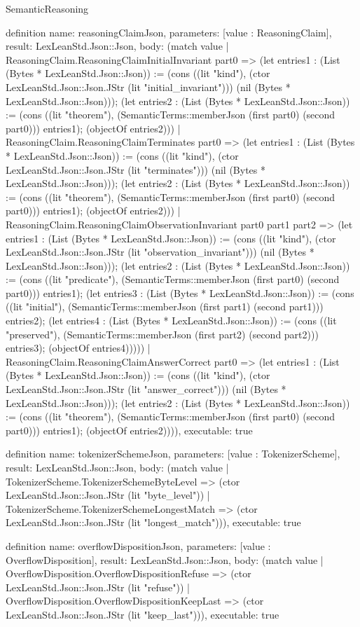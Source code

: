 \begin{lexlean}{SemanticReasoning}
\begin{semanticmodule}
definition{
  name: reasoningClaimJson,
  parameters: [value : ReasoningClaim],
  result: LexLeanStd.Json::Json,
  body: (match value
    | ReasoningClaim.ReasoningClaimInitialInvariant part0 => (let entries1 : (List (Bytes * LexLeanStd.Json::Json)) := (cons ((lit "kind"), (ctor LexLeanStd.Json::Json.JStr (lit "initial_invariant"))) (nil (Bytes * LexLeanStd.Json::Json))); (let entries2 : (List (Bytes * LexLeanStd.Json::Json)) := (cons ((lit "theorem"), (SemanticTerms::memberJson (first part0) (second part0))) entries1); (objectOf entries2)))
    | ReasoningClaim.ReasoningClaimTerminates part0 => (let entries1 : (List (Bytes * LexLeanStd.Json::Json)) := (cons ((lit "kind"), (ctor LexLeanStd.Json::Json.JStr (lit "terminates"))) (nil (Bytes * LexLeanStd.Json::Json))); (let entries2 : (List (Bytes * LexLeanStd.Json::Json)) := (cons ((lit "theorem"), (SemanticTerms::memberJson (first part0) (second part0))) entries1); (objectOf entries2)))
    | ReasoningClaim.ReasoningClaimObservationInvariant part0 part1 part2 => (let entries1 : (List (Bytes * LexLeanStd.Json::Json)) := (cons ((lit "kind"), (ctor LexLeanStd.Json::Json.JStr (lit "observation_invariant"))) (nil (Bytes * LexLeanStd.Json::Json))); (let entries2 : (List (Bytes * LexLeanStd.Json::Json)) := (cons ((lit "predicate"), (SemanticTerms::memberJson (first part0) (second part0))) entries1); (let entries3 : (List (Bytes * LexLeanStd.Json::Json)) := (cons ((lit "initial"), (SemanticTerms::memberJson (first part1) (second part1))) entries2); (let entries4 : (List (Bytes * LexLeanStd.Json::Json)) := (cons ((lit "preserved"), (SemanticTerms::memberJson (first part2) (second part2))) entries3); (objectOf entries4)))))
    | ReasoningClaim.ReasoningClaimAnswerCorrect part0 => (let entries1 : (List (Bytes * LexLeanStd.Json::Json)) := (cons ((lit "kind"), (ctor LexLeanStd.Json::Json.JStr (lit "answer_correct"))) (nil (Bytes * LexLeanStd.Json::Json))); (let entries2 : (List (Bytes * LexLeanStd.Json::Json)) := (cons ((lit "theorem"), (SemanticTerms::memberJson (first part0) (second part0))) entries1); (objectOf entries2)))),
  executable: true
}

definition{
  name: tokenizerSchemeJson,
  parameters: [value : TokenizerScheme],
  result: LexLeanStd.Json::Json,
  body: (match value
    | TokenizerScheme.TokenizerSchemeByteLevel => (ctor LexLeanStd.Json::Json.JStr (lit "byte_level"))
    | TokenizerScheme.TokenizerSchemeLongestMatch => (ctor LexLeanStd.Json::Json.JStr (lit "longest_match"))),
  executable: true
}

definition{
  name: overflowDispositionJson,
  parameters: [value : OverflowDisposition],
  result: LexLeanStd.Json::Json,
  body: (match value
    | OverflowDisposition.OverflowDispositionRefuse => (ctor LexLeanStd.Json::Json.JStr (lit "refuse"))
    | OverflowDisposition.OverflowDispositionKeepLast => (ctor LexLeanStd.Json::Json.JStr (lit "keep_last"))),
  executable: true
}


\end{semanticmodule}
\end{lexlean}
